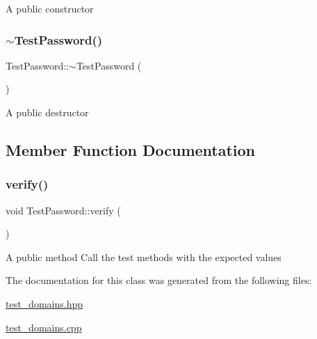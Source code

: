A public constructor \mbox{\label{class_test_password_a944afaaae5f53c83d3060f93c2f4f474}} 
\subsubsection{\texorpdfstring{$\sim$\+Test\+Password()}{~TestPassword()}}
{\footnotesize\ttfamily Test\+Password\+::$\sim$\+Test\+Password (\begin{DoxyParamCaption}{ }\end{DoxyParamCaption})}

A public destructor 

\subsection{Member Function Documentation}
\mbox{\label{class_test_password_ac1b1f3a83e7e6b76b635a0e09004c7b6}} 
\subsubsection{\texorpdfstring{verify()}{verify()}}
{\footnotesize\ttfamily void Test\+Password\+::verify (\begin{DoxyParamCaption}{ }\end{DoxyParamCaption})}

A public method Call the test methods with the expected values 

The documentation for this class was generated from the following files\+:\begin{DoxyCompactItemize}
\item 
\hyperlink{test__domains_8hpp}{test\+\_\+domains.\+hpp}\item 
\hyperlink{test__domains_8cpp}{test\+\_\+domains.\+cpp}\end{DoxyCompactItemize}
